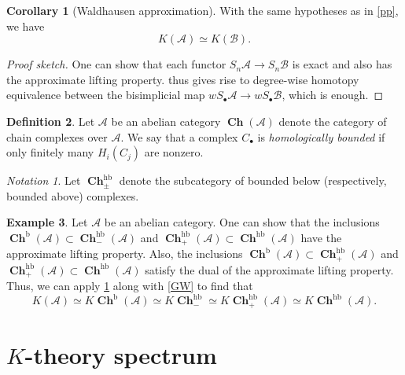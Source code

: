 \documentclass[10pt,letterpaper,cm]{nupset}
\theoremstyle{definition}
\newtheorem{definition}{Definition}[section]
\newtheorem{exmp}[definition]{Example}
\theoremstyle{theorem}
\newtheorem{corollary}[definition]{Corollary}
\theoremstyle{remark}
\newtheorem*{notation}{Notation}
\newcommand{\1}{\mathbf{1}}
\renewcommand{\a}{\mathscr{A}}
\renewcommand{\b}{\mathscr{B}}
\newcommand{\0}{\vec 0}
\DeclareMathOperator{\hb}{hb}
\DeclareMathOperator{\bo}{b}
\DeclareMathOperator{\ch}{\mathbf{Ch}}
\begin{document}
\begin{corollary}[Waldhausen approximation]\label{approx}
With the same hypotheses as in \cref{pp}, we have $$K(\a) \simeq K(\b).$$
\end{corollary}
\begin{proof}[Proof sketch]
One can show that each functor $S_n \a \to S_n \b$ is exact and also has the approximate lifting property.   thus gives rise to degree-wise homotopy equivalence between the bisimplicial map $wS_{\bullet}\a \to wS_{\bullet} \b$, which is enough. 
\end{proof}

\smallskip

\begin{definition}
Let $\a$ be an abelian category $\ch(\a)$ denote the category of chain complexes over $\a$. We say that a complex $C_{\bullet}$ is \textit{homologically bounded} if only finitely many $H_i(C_j)$ are nonzero. 
\end{definition}

\begin{notation}
Let $\ch_{\pm}^{\hb}$ denote the subcategory of bounded below (respectively, bounded above) complexes. 
\end{notation}

\begin{exmp}
Let $\a$ be an abelian category. One can show that the inclusions $\ch^{\bo}(\a) \subset \ch_{-}^{\hb}(\a)$ and $\ch_+^{\hb}(\a)\subset \ch^{\hb}(\a)$ have the approximate lifting property. Also, the inclusions $\ch^{\bo}(\a) \subset \ch_+^{\hb}(\a)$ and $\ch_+^{\hb}(\a)\subset \ch^{\hb}(\a)$ satisfy the dual of the approximate lifting property. Thus, we can apply \cref{approx} along with \cref{GW} to find that $$  K(\a) \simeq K\ch^{\bo}(\a) \simeq  K\ch_{-}^{\hb}\simeq K\ch_{+}^{\hb}(\a) \simeq K \ch^{\hb}(\a).$$
\end{exmp}

\section{$K$-theory spectrum}
\end{document}
